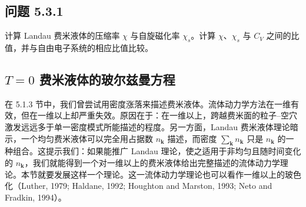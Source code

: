 \subsection*{问题 5.3.1}

计算 Landau 费米液体的压缩率 $\chi$ 与自旋磁化率 $\chi_s$。计算 $\chi$、$\chi_s$ 与 $C_V$ 之间的比值，并与自由电子系统的相应比值比较。

\subsection{$T=0$ 费米液体的玻尔兹曼方程}

在 5.1.3 节中，我们曾尝试用密度涨落来描述费米液体。流体动力学方法在一维有效，但在一维以上却严重失效。原因在于：在一维以上，跨越费米面的粒子--空穴激发远远多于单一密度模式所能描述的程度。另一方面，Landau 费米液体理论暗示，一个均匀费米液体可以完全用占据数 $n_{\pmb{k}}$ 描述，而密度 $\sum_{\pmb{k}} n_{\pmb{k}}$ 只是 $n_{\pmb{k}}$ 的一种组合。这提示我们：如果能推广 Landau 理论，使之适用于非均匀且随时间变化的 $n_{\pmb{k}}$，我们就能得到一个对一维以上的费米液体给出完整描述的流体动力学理论。本节就要发展这样一个理论。这一流体动力学理论也可以看作一维以上的玻色化（Luther, 1979; Haldane, 1992; Houghton and Marston, 1993; Neto and Fradkin, 1994）。

